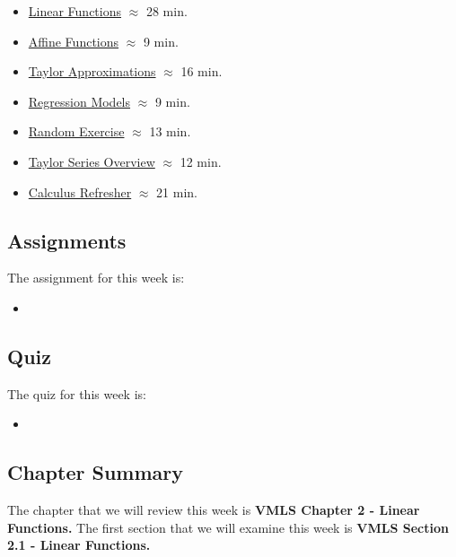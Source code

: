 \begin{itemize}
    \item \href{https://applied.cs.colorado.edu/mod/hvp/view.php?id=50678}{Linear Functions} $\approx$ 28 min.
    \item \href{https://applied.cs.colorado.edu/mod/hvp/view.php?id=50679}{Affine Functions} $\approx$ 9 min.
    \item \href{https://applied.cs.colorado.edu/mod/hvp/view.php?id=50680}{Taylor Approximations} $\approx$ 16 min.
    \item \href{https://applied.cs.colorado.edu/mod/hvp/view.php?id=50681}{Regression Models} $\approx$ 9 min.
    \item \href{https://applied.cs.colorado.edu/mod/hvp/view.php?id=50682}{Random Exercise} $\approx$ 13 min.
    \item \href{https://www.youtube.com/watch?v=eX1hvWxmJVE}{Taylor Series Overview} $\approx$ 12 min.
    \item \href{https://applied.cs.colorado.edu/mod/hvp/view.php?id=50684}{Calculus Refresher} $\approx$ 21 min.
\end{itemize}

\subsection{Assignments}

The assignment for this week is:

\begin{itemize}
    \item {}
\end{itemize}

\subsection{Quiz}

The quiz for this week is:

\begin{itemize}
    \item {}
\end{itemize}

\subsection{Chapter Summary}

The chapter that we will review this week is \textbf{VMLS Chapter 2 - Linear Functions.} The first section that we will examine this week is \textbf{VMLS Section 2.1 - Linear Functions.}

